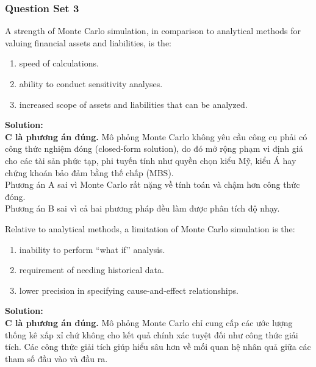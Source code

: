 \subsubsection{Question Set 3}
\label{subsec:app_mod9_Question_Set_3}

\begin{tcolorbox}[
	colback=gray!5!white,
	colframe=black!15!white,
	boxrule=0.5pt,
	arc=3pt,
	title=\textbf{Question 1},
	coltitle=black,
	colbacktitle=black!5!white,
	before skip=6pt,
	after skip=6pt,
	breakable
]
A strength of Monte Carlo simulation, in comparison to analytical methods for valuing financial assets and liabilities, is the:
\begin{enumerate}[label=\Alph*.]
	\item speed of calculations.
	\item ability to conduct sensitivity analyses.
	\item increased scope of assets and liabilities that can be analyzed.
\end{enumerate}

\textbf{Solution:} \\
\textbf{C là phương án đúng.} Mô phỏng Monte Carlo không yêu cầu công cụ phải có công thức nghiệm đóng (closed-form solution), do đó mở rộng phạm vi định giá cho các tài sản phức tạp, phi tuyến tính như quyền chọn kiểu Mỹ, kiểu Á hay chứng khoán bảo đảm bằng thế chấp (MBS). \\
Phương án A sai vì Monte Carlo rất nặng về tính toán và chậm hơn công thức đóng. \\
Phương án B sai vì cả hai phương pháp đều làm được phân tích độ nhạy.
\end{tcolorbox}

\begin{tcolorbox}[
	colback=gray!5!white,
	colframe=black!15!white,
	boxrule=0.5pt,
	arc=3pt,
	title=\textbf{Question 2},
	coltitle=black,
	colbacktitle=black!5!white,
	before skip=6pt,
	after skip=6pt,
	breakable
]
Relative to analytical methods, a limitation of Monte Carlo simulation is the:
\begin{enumerate}[label=\Alph*.]
	\item inability to perform ``what if'' analysis.
	\item requirement of needing historical data.
	\item lower precision in specifying cause-and-effect relationships.
\end{enumerate}

\textbf{Solution:} \\
\textbf{C là phương án đúng.} Mô phỏng Monte Carlo chỉ cung cấp các ước lượng thống kê xấp xỉ chứ không cho kết quả chính xác tuyệt đối như công thức giải tích. Các công thức giải tích giúp hiểu sâu hơn về mối quan hệ nhân quả giữa các tham số đầu vào và đầu ra.
\end{tcolorbox}

